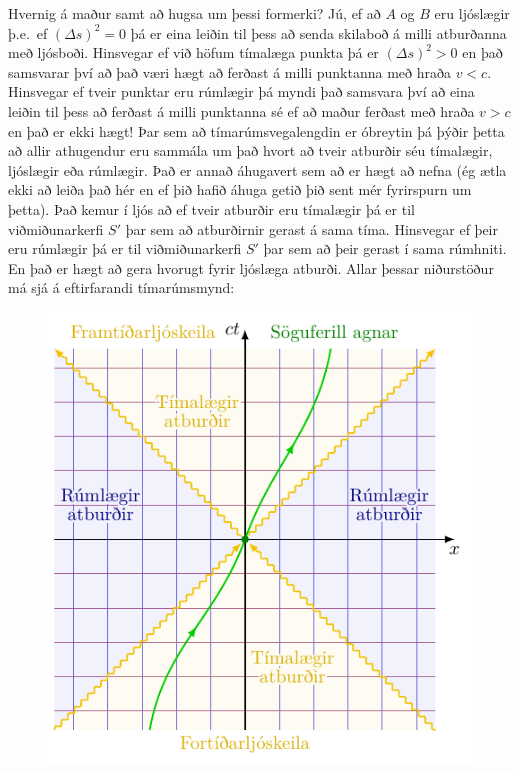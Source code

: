 \ifdefined \wholebook \else\documentclass[oneside]{book}\usepackage{EdlBook}\graphicspath{{figures/}}
\begin{document}
Hvernig á maður samt að hugsa um þessi formerki? Jú, ef að $A$ og $B$ eru ljóslægir þ.e.~ef $(\Delta s)^2 = 0$ þá er eina leiðin til þess að senda skilaboð á milli atburðanna með ljósboði. Hinsvegar ef við höfum tímalæga punkta þá er $(\Delta s)^2 > 0$ en það samsvarar því að það væri hægt að ferðast á milli punktanna með hraða $v < c$. Hinsvegar ef tveir punktar eru rúmlægir þá myndi það samsvara því að eina leiðin til þess að ferðast á milli punktanna sé ef að maður ferðast með hraða $v > c$ en það er ekki hægt! Þar sem að tímarúmsvegalengdin er óbreytin þá þýðir þetta að allir athugendur eru sammála um það hvort að tveir atburðir séu tímalægir, ljóslægir eða rúmlægir. Það er annað áhugavert sem að er hægt að nefna (ég ætla ekki að leiða það hér en ef þið hafið áhuga getið þið sent mér fyrirspurn um þetta). Það kemur í ljós að ef tveir atburðir eru tímalægir þá er til viðmiðunarkerfi $S'$ þar sem að atburðirnir gerast á sama tíma. Hinsvegar ef þeir eru rúmlægir þá er til viðmiðunarkerfi $S'$ þar sem að þeir gerast í sama rúmhniti. En það er hægt að gera hvorugt fyrir ljóslæga atburði. Allar þessar niðurstöður má sjá á eftirfarandi tímarúmsmynd:
\begin{figure}[H]
    \centering
    \includegraphics[scale = 0.8]{figures/spacetime6.pdf}
\end{figure}
\end{document}
